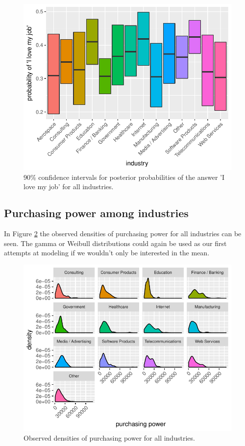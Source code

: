 \documentclass{article}
\begin{document}
\begin{figure}[H]
\centering
\includegraphics{report-038}
\caption{90\% confidence intervals for posterior probabilities of the answer 'I love my job' for all industries.}\label{fig_11}
\end{figure}

\subsection{Purchasing power among industries}
In Figure \ref{fig_12} the observed densities of purchasing power for all industries can be seen. The gamma or Weibull distributions could again be used as our first attempts at modeling if we wouldn't only be interested in the mean.


\begin{figure}[H]
\centering
\includegraphics{report-040}
\caption{Observed densities of purchasing power for all industries.}\label{fig_12}
\end{figure}
\end{document}
